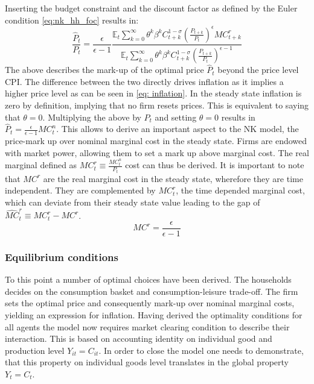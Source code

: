 \documentclass[12pt,a4paper,english]{article} %
\newcommand{\E}{\mathbb{E}} %
\begin{document}
	Inserting the budget constraint and the discount factor as defined by the Euler condition \ref{eq:nk_hh_foc} results in:
	\begin{equation}
		\frac{\hat{P}_t}{P_t} = \frac{\epsilon}{\epsilon-1} 
		\frac{
		\E_t \sum_{k=0}^{\infty} \theta^k \beta^k C_{t+k}^{1-\sigma} (\frac{P_{t+k}}{P_t})^\epsilon MC_{t+k}^r
		}{
		\E_t \sum_{k=0}^{\infty} \theta^k \beta^k C_{t+k}^{1-\sigma} (\frac{P_{t+k}}{P_t})^{\epsilon-1}
		}
	\end{equation}
	The above describes the mark-up of the optimal price $\hat{P}_t$ beyond the price level CPI. The difference between the two directly drives inflation as it implies a higher price level as can be seen in \ref{eq: inflation}. 
	In the steady state inflation is zero by definition, implying that no firm resets prices. This is equivalent to saying that $\theta=0$. Multiplying the above by $P_t$ and setting $\theta=0$ results in $\hat{P}_t = \frac{\epsilon}{\epsilon-1} MC_t^n$. This allows to derive an important aspect to the NK model, the price-mark up over nominal marginal cost in the steady state. Firms are endowed with market power, allowing them to set a mark up above marginal cost. The real marginal defined as $MC_t^r \equiv \frac{MC_t^n}{P_t}$ cost can thus be derived. It is important to note that $MC^r$ are the real marginal cost in the steady state, wherefore they are time independent. They are complemented by $MC_t^r$, the time depended marginal cost, which can deviate from their steady state value leading to the gap of $\hat{MC}_t^r \equiv MC_t^r - MC^r$.
	\begin{equation}
		MC^r = \frac{\epsilon}{\epsilon-1}
	\end{equation} 
	
	
	\subsubsection{Equilibrium conditions}
	To this point a number of optimal choices have been derived. The households decides on the consumption basket and consumption-leisure trade-off. The firm sets the optimal price and consequently mark-up over nominal marginal costs, yielding an expression for inflation. Having derived the optimality conditions for all agents the model now requires market clearing condition to describe their interaction. This is based on accounting identity on individual good and production level $Y_{it} = C_{it}$. In order to close the model one needs to demonstrate, that this property on individual goods level translates in the global property $Y_t = C_t$.
	
\end{document}
